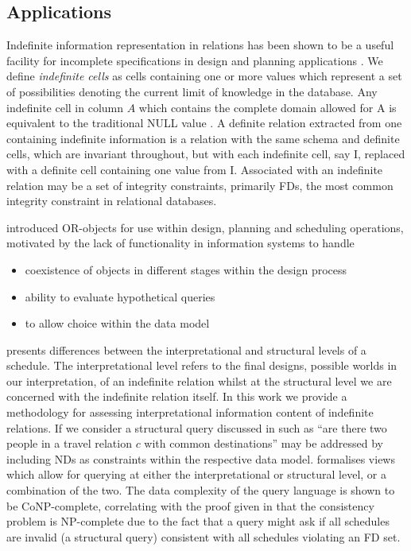 \subsection{Applications}
		
Indefinite information representation in relations has been shown to be 
a useful facility for incomplete specifications in design and planning
applications \cite{inv91,ivv95,vn95}. We define {\em indefinite cells} as cells
containing one or more values which represent a set of possibilities denoting
 the current limit of knowledge in the database. Any indefinite cell in 
column $A$ which contains the complete domain allowed for A is equivalent to
the traditional NULL value \cite{lip79}.
 A definite relation extracted from
one containing indefinite information is a relation with the same schema
and definite cells, which are invariant throughout, but with each indefinite
cell, say I, replaced with a definite cell containing one value from I.  
Associated with an indefinite
relation may be a set of integrity constraints, primarily FDs, the
most common integrity constraint in relational databases. 
\medskip


\cite{inv91} introduced OR-objects for use within design, planning and
scheduling operations, motivated by the lack of functionality in
information systems to handle
\begin{itemize}
\item coexistence of objects in different stages within the design
process
\item ability to evaluate hypothetical queries
\item to allow choice within the data model
\end{itemize}

\cite{inv91} presents differences between the interpretational and
structural levels of a schedule. The interpretational level refers to
the final designs, possible worlds in our interpretation, of an
indefinite relation whilst at the structural level we are concerned with
the indefinite relation itself. In this work we provide a methodology
for assessing interpretational information content of indefinite
relations. If we consider a structural query discussed in
\cite{inv91} such as ``are there two people in a travel relation $c$
with common destinations'' may be addressed by including NDs as
constraints within the respective data model.  \cite{inv91} formalises
views which allow for querying at either the interpretational or
structural level, or a combination of the two. The data complexity of
the query language is shown to be CoNP-complete, correlating with the
proof given in \cite{vn95} that the consistency problem is NP-complete
due to the fact that a query might ask if all schedules are invalid (a
structural query) consistent with all schedules violating an FD set.

